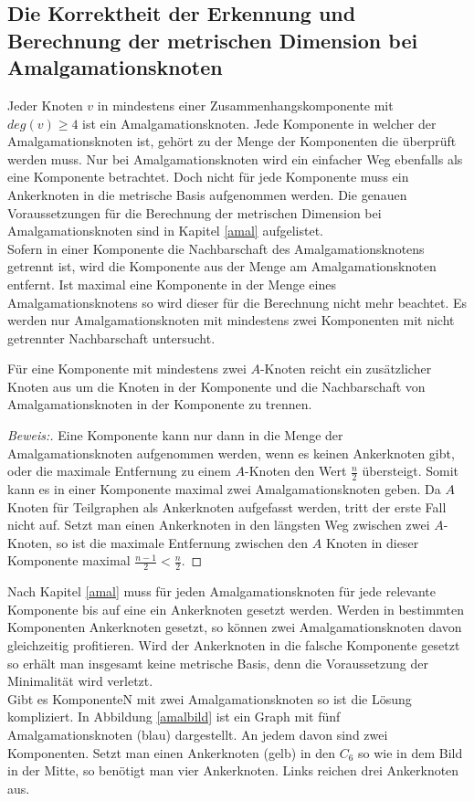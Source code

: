 \subsection{Die Korrektheit der Erkennung und Berechnung der metrischen Dimension bei Amalgamationsknoten}
\label{korramal}
Jeder Knoten $v$ in mindestens einer Zusammenhangskomponente mit $deg(v)\geq 4$ ist ein Amalgamationsknoten. Jede Komponente in welcher der Amalgamationsknoten ist, gehört zu der Menge der Komponenten die überprüft werden muss. Nur bei Amalgamationsknoten wird ein einfacher Weg ebenfalls als eine Komponente betrachtet. Doch nicht für jede Komponente muss ein Ankerknoten in die metrische Basis aufgenommen werden.
Die genauen Voraussetzungen für die Berechnung der metrischen Dimension bei Amalgamationsknoten sind in Kapitel \ref{amal} aufgelistet.\\Sofern in einer Komponente die Nachbarschaft des Amalgamationsknotens getrennt ist, wird die Komponente aus der Menge am Amalgamationsknoten entfernt. Ist maximal eine Komponente in der Menge eines Amalgamationsknotens so wird dieser für die Berechnung nicht mehr beachtet. Es werden nur Amalgamationsknoten mit mindestens zwei Komponenten mit nicht getrennter Nachbarschaft untersucht.
\begin{lem}
Für eine Komponente mit mindestens zwei $A$-Knoten reicht ein zusätzlicher Knoten aus um die Knoten in der Komponente und die Nachbarschaft von Amalgamationsknoten in der Komponente zu trennen.
\end{lem}
\vspace{-4mm}
\begin{proof}[Beweis:]
Eine Komponente kann nur dann in die Menge der Amalgamationsknoten aufgenommen werden, wenn es keinen Ankerknoten gibt, oder die maximale Entfernung zu einem $A$-Knoten den Wert $\frac{n}{2}$ übersteigt. Somit kann es in einer Komponente maximal zwei Amalgamationsknoten geben. Da $A$ Knoten für Teilgraphen als Ankerknoten aufgefasst werden, tritt der erste Fall nicht auf. Setzt man einen Ankerknoten in den längsten Weg zwischen zwei $A$-Knoten, so ist die maximale Entfernung zwischen den $A$ Knoten in dieser Komponente maximal $\frac{n-1}{2} < \frac{n}{2}$.
\end{proof}
\vspace{-3mm}
Nach Kapitel \ref{amal} muss für jeden Amalgamationsknoten für jede relevante Komponente bis auf eine ein Ankerknoten gesetzt werden. Werden in bestimmten Komponenten Ankerknoten gesetzt, so können zwei Amalgamationsknoten davon gleichzeitig profitieren. Wird der Ankerknoten in die falsche Komponente gesetzt so erhält man insgesamt keine metrische Basis, denn die Voraussetzung der Minimalität wird verletzt.\\
Gibt es KomponenteN mit zwei Amalgamationsknoten so ist die Lösung kompliziert. In Abbildung \ref{amalbild} ist ein Graph mit fünf Amalgamationsknoten (blau) dargestellt. An jedem davon sind zwei Komponenten. Setzt man einen Ankerknoten (gelb) in den $C_6$ so wie in dem Bild in der Mitte, so benötigt man vier Ankerknoten. Links reichen drei Ankerknoten aus.

